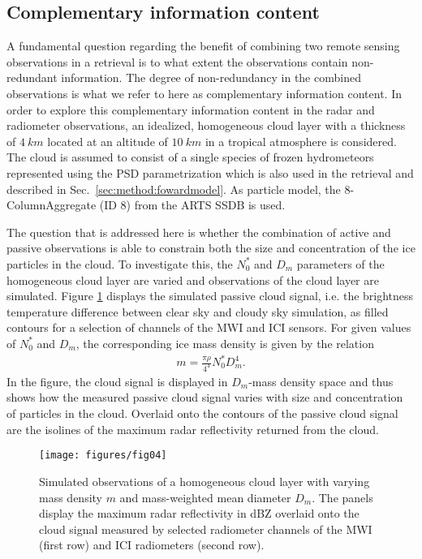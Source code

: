 \documentclass[journal abbreviation, manuscript]{copernicus}
\begin{document}
\subsection{Complementary information content}
\label{sec:simple_cloud}

A fundamental question regarding the benefit of combining two remote sensing
observations in a retrieval is to what extent the observations contain
non-redundant information. The degree of non-redundancy in the combined
observations is what we refer to here as complementary information content.
In order to explore this complementary information content in the radar and
radiometer observations, an idealized, homogeneous cloud layer with a thickness
of $4\ \unit{km}$ located at an altitude of $10\ \unit{km}$ in a tropical
atmosphere is considered. The cloud is assumed to consist of a single species of
frozen hydrometeors represented using the PSD parametrization which is also used
in the retrieval and described in Sec.~\ref{sec:method:fowardmodel}. As particle
model, the 8-ColumnAggregate (ID 8) from the ARTS SSDB is used.

The question that is addressed here is whether the combination of active and
passive observations is able to constrain both the size and concentration of the
ice particles in the cloud. To investigate this, the $N_0^*$ and $D_m$
parameters of the homogeneous cloud layer are varied and observations of the
cloud layer are simulated. Figure \ref{fig:contours} displays the simulated
passive cloud signal, i.e. the brightness temperature difference between clear
sky and cloudy sky simulation, as filled contours for a selection of channels of
the MWI and ICI sensors. For given values of $N_0^*$ and $D_m$, the
corresponding ice mass density is given by
the relation
\begin{align}
m = \frac{\pi \rho}{4 ^ 4}N_0^* D_m^4.
\end{align}
In the figure, the cloud signal is displayed in $D_m$-mass density space and
thus shows how the measured passive cloud signal varies with size and concentration
of particles in the cloud. Overlaid onto the contours of the
passive cloud signal are the isolines of the maximum radar reflectivity returned
from the cloud.

\begin{figure}
\centering
\texttt{[image: figures/fig04]}
\caption{Simulated observations of a homogeneous cloud layer with
varying mass density $m$ and mass-weighted mean diameter $D_m$. The panels
display the maximum radar reflectivity in dBZ  overlaid onto the
cloud signal measured by selected radiometer channels of the MWI
(first row) and  ICI radiometers (second row).}
\label{fig:contours}
\end{figure}
\end{document}
